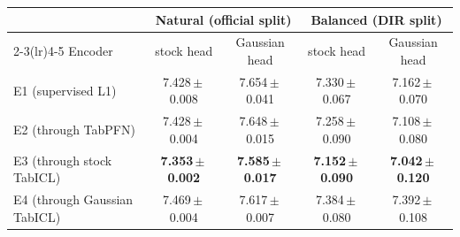\begin{tabular}{lcccc}
\toprule
& \multicolumn{2}{c}{Natural (official split)} & \multicolumn{2}{c}{Balanced (DIR split)} \\
\cmidrule(lr){2-3}\cmidrule(lr){4-5}
Encoder & stock head & Gaussian head & stock head & Gaussian head \\
\midrule
E1 (supervised L1) & 7.428\,$\pm$\,0.008 & 7.654\,$\pm$\,0.041 & 7.330\,$\pm$\,0.067 & 7.162\,$\pm$\,0.070 \\
E2 (through TabPFN) & 7.428\,$\pm$\,0.004 & 7.648\,$\pm$\,0.015 & 7.258\,$\pm$\,0.090 & 7.108\,$\pm$\,0.080 \\
E3 (through stock TabICL) & \textbf{7.353\,$\pm$\,0.002} & \textbf{7.585\,$\pm$\,0.017} & \textbf{7.152\,$\pm$\,0.090} & \textbf{7.042\,$\pm$\,0.120} \\
E4 (through Gaussian TabICL) & 7.469\,$\pm$\,0.004 & 7.617\,$\pm$\,0.007 & 7.384\,$\pm$\,0.080 & 7.392\,$\pm$\,0.108 \\
\bottomrule
\end{tabular}
